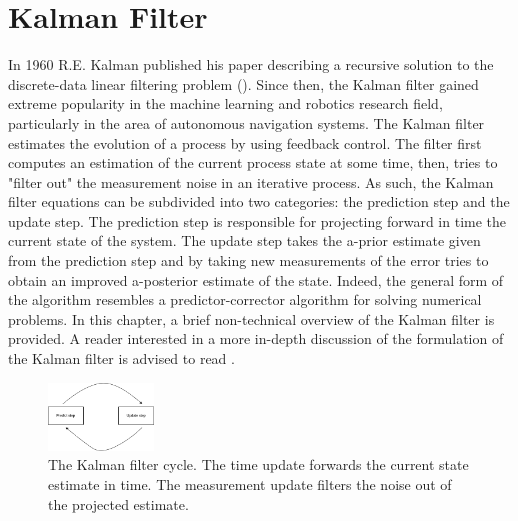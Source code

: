 \documentclass[mscthesis]{usiinfthesis}
\begin{document}
\section{Kalman Filter}
\label{sec:kalman}

In 1960 R.E. Kalman published his paper describing a recursive solution to the discrete-data linear filtering problem (\citet{paper:kalmanfilter}). Since then, the Kalman filter gained extreme popularity in the machine learning and robotics research field, particularly in the area of autonomous navigation systems. The Kalman filter estimates the evolution of a process by using feedback control. The filter first computes an estimation of the current process state at some time, then, tries to "filter out" the measurement noise in an iterative process. As such, the Kalman filter equations can be subdivided into two categories: the prediction step and the update step. The prediction step is responsible for projecting forward in time the current state of the system. The update step takes the a-prior estimate given from the prediction step and by taking new measurements of the error tries to obtain an improved a-posterior estimate of the state. Indeed, the general form of the algorithm resembles a predictor-corrector algorithm for solving numerical problems. In this chapter, a brief non-technical overview of the Kalman filter is provided. A reader interested in a more in-depth discussion of the formulation of the Kalman filter is advised to read \citet{paper:Maybeck79}.


\begin{figure}[h]
    \centering
    \includegraphics[width=0.25\textwidth]{kalman_diagram.png}
    \caption{The Kalman filter cycle. The time update forwards the current state estimate in time. The measurement update filters the noise out of the projected estimate.}
    \label{fig:kalman_cycle}
\end{figure}
\end{document}

